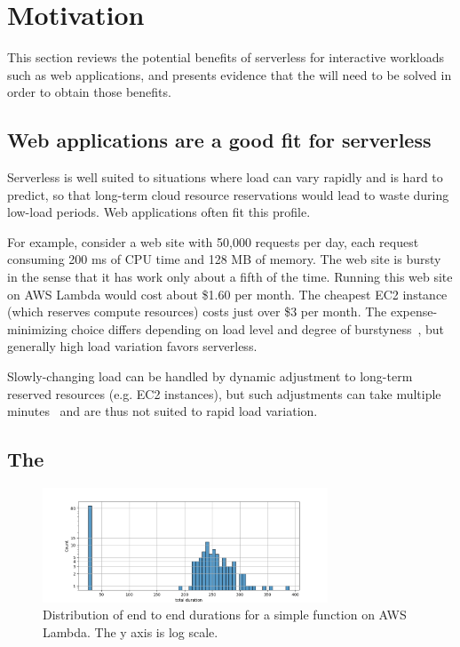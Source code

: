 \section{Motivation}\label{s:motivation}

This section reviews the potential benefits of serverless for
interactive workloads such as web applications, and presents
evidence that the {\problem} will need to be solved in order to
obtain those benefits.

\subsection{Web applications are a good fit for serverless}

Serverless is well suited to situations where load can vary rapidly
and is hard to predict, so that long-term cloud resource reservations
would lead to waste during low-load periods. Web applications often
fit this profile.

For example, consider a web site with 50,000 requests per day, each
request consuming 200 ms of CPU time and 128 MB of memory. The web
site is bursty in the sense that it has work only about a fifth of the
time. Running this web site on AWS Lambda would cost about \$1.60 per
month. The cheapest EC2 instance (which reserves compute resources)
costs just over \$3 per month. The expense-minimizing choice differs
depending on load level and degree of
burstyness~\cite{econ-of-serverless,trek10-blog},
but generally high load variation favors serverless.

Slowly-changing load can be handled by dynamic adjustment to long-term
reserved resources (e.g. EC2 instances), but such adjustments can take
multiple minutes~\cite{ec2-autoscaling} and are thus not suited to
rapid load variation.

\subsection{The \problem{}}


\begin{figure}[t!]
    \centering
      \includegraphics[width=8.5cm]{img/lambda_total_durations.png}
      \caption{Distribution of end to end durations for a simple function on AWS Lambda. The y axis is log scale. }
    \label{fig:lambda-total-durations}
\end{figure}

